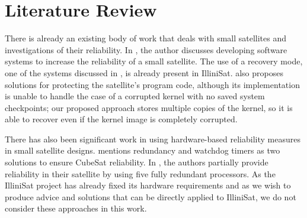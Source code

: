 \section{Literature Review}

There is already an existing body of work that deals with small satellites and
investigations of their reliability.  In \cite{odegaard2013error}, the author
discusses developing software systems to increase the reliability of a small satellite.
The use of a recovery mode, one of the systems discussed in
\cite{odegaard2013error}, is already present in IlliniSat.
\cite{odegaard2013error} also proposes solutions for protecting the satellite's
program code, although its implementation is unable to handle the case of a
corrupted kernel with no saved system checkpoints; our proposed approach stores
multiple copies of the kernel, so it is able to recover even if the kernel image
is completely corrupted.

There has also been significant work in using hardware-based reliability measures in small satellite designs.  \cite{toorian2008cubesat} mentions redundancy and watchdog timers as two solutions to ensure CubeSat reliability.  In \cite{passerone2008design}, the authors partially provide reliability in their satellite by using five fully redundant processors.   As the IlliniSat project has already fixed its hardware requirements and as we wish to produce advice and solutions that can be directly applied to IlliniSat, we do not consider these approaches in this work.
